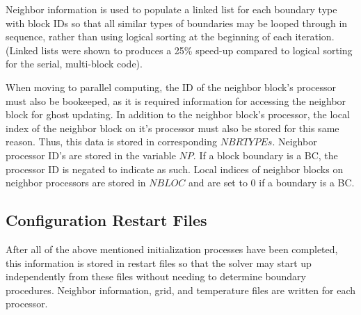 \documentclass[twocolumn,10pt]{asme2ej}
\begin{document}
Neighbor information is used to populate a linked list for each boundary type with block IDs so that all similar types of boundaries may be looped through in sequence, rather than using logical sorting at the beginning of each iteration.  (Linked lists were shown to produces a 25\% speed-up compared to logical sorting for the serial, multi-block code).

When moving to parallel computing, the ID of the neighbor block’s processor must also be bookeeped, as it is required information for accessing the neighbor block for ghost updating.  In addition to the neighbor block’s processor, the local index of the neighbor block on it’s processor must also be stored for this same reason.  Thus, this data is stored in corresponding $NBRTYPEs$.  Neighbor processor ID’s are stored in the variable $NP$.  If a block boundary is a BC, the processor ID is negated to indicate as such.  Local indices of neighbor blocks on neighbor processors are stored in $NBLOC$ and are set to 0 if a boundary is a BC.

\subsection{Configuration Restart Files}
After all of the above mentioned initialization processes have been completed, this information is stored in restart files so that the solver may start up independently from these files without needing to determine boundary procedures.  Neighbor information, grid, and temperature files are written for each processor.



\end{document}
